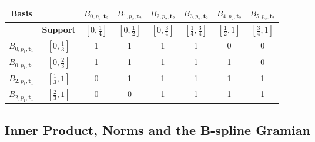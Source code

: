 \begin{indentedexample}
    \centering
    \small
    \begin{tabular}{c|c||c|c|c|c|c|c}
        \textbf{Basis} &  & $B_{0, p_2, \mathbf{t}_2}$ & $B_{1, p_2, \mathbf{t}_2}$ & $B_{2, p_2, \mathbf{t}_2}$ & $B_{3, p_2, \mathbf{t}_2}$ & $B_{4, p_2, \mathbf{t}_2}$ & $B_{5, p_2, \mathbf{t}_2}$ \\[5pt]
        \hline
        \rule{0pt}{2.5ex} & \textbf{Support} & $\left[0, \frac{1}{4}\right]$ & $\left[0, \frac{1}{2}\right]$ & $\left[0, \frac{3}{4}\right]$ & $\left[\frac{1}{4}, \frac{3}{4}\right]$ & $\left[\frac{1}{2}, 1\right]$ & $\left[\frac{3}{4}, 1\right]$ \\[5pt]
        \hline\hline
        \rule{0pt}{2.5ex}$B_{0, p_1, \mathbf{t}_1}$ & $\left[0, \frac{1}{3}\right]$ & 
        1 & 1 & 1 & 1 & 0 & 0 \\[5pt]\hline\rule{0pt}{2.5ex}
        $B_{0, p_1, \mathbf{t}_1}$ & $\left[0, \frac{2}{3}\right]$ &
        1 & 1 & 1 & 1 & 1 & 0 \\[5pt]\hline\rule{0pt}{2.5ex}
        $B_{2, p_1, \mathbf{t}_1}$ & $\left[\frac{1}{3}, 1\right]$ &
        0 & 1 & 1 & 1 & 1 & 1 \\[5pt]\hline\rule{0pt}{2.5ex}
        $B_{2, p_1, \mathbf{t}_1}$ & $\left[\frac{2}{3}, 1\right]$ & 
        0 & 0 & 1 & 1 & 1 & 1 \\[5pt]
    \end{tabular}
    \label{tab:ex-spline-supports}

\end{indentedexample}

\subsection{Inner Product, Norms and the B-spline Gramian}\label{sec:inner-product}
